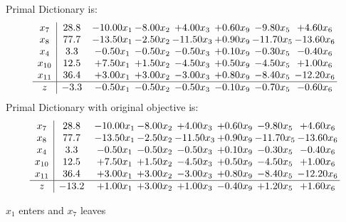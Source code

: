 \documentclass[8pt]{article}
\begin{document}
Primal Dictionary is:
\[\begin{array}{c| c c@{\hskip 2pt} c@{\hskip 2pt} c@{\hskip 2pt} c@{\hskip 2pt} c@{\hskip 2pt} c@{\hskip 2pt} }
 x_{7}   &  28.8 & -10.00 x_{1} & -8.00 x_{2} & +  4.00 x_{3} & +  0.60 x_{9} & -9.80 x_{5} & +  4.60 x_{6}\\
 x_{8}   &  77.7 & -13.50 x_{1} & -2.50 x_{2} & -11.50 x_{3} & +  0.90 x_{9} & -11.70 x_{5} & -13.60 x_{6}\\
 x_{4}   &  3.3 & -0.50 x_{1} & -0.50 x_{2} & -0.50 x_{3} & +  0.10 x_{9} & -0.30 x_{5} & -0.40 x_{6}\\
 x_{10}   &  12.5 & +  7.50 x_{1} & +  1.50 x_{2} & -4.50 x_{3} & +  0.50 x_{9} & -4.50 x_{5} & +  1.00 x_{6}\\
 x_{11}   &  36.4 & +  3.00 x_{1} & +  3.00 x_{2} & -3.00 x_{3} & +  0.80 x_{9} & -8.40 x_{5} & -12.20 x_{6}\\
\hline
z    &  -3.3 & -0.50 x_{1} & -0.50 x_{2} & -0.50 x_{3} & -0.10 x_{9} & -0.70 x_{5} & -0.60 x_{6}\\
\end{array}\]
Primal Dictionary with original objective is:
\[\begin{array}{c| c c@{\hskip 2pt} c@{\hskip 2pt} c@{\hskip 2pt} c@{\hskip 2pt} c@{\hskip 2pt} c@{\hskip 2pt} }
 x_{7}   &  28.8 & -10.00 x_{1} & -8.00 x_{2} & +  4.00 x_{3} & +  0.60 x_{9} & -9.80 x_{5} & +  4.60 x_{6}\\
 x_{8}   &  77.7 & -13.50 x_{1} & -2.50 x_{2} & -11.50 x_{3} & +  0.90 x_{9} & -11.70 x_{5} & -13.60 x_{6}\\
 x_{4}   &  3.3 & -0.50 x_{1} & -0.50 x_{2} & -0.50 x_{3} & +  0.10 x_{9} & -0.30 x_{5} & -0.40 x_{6}\\
 x_{10}   &  12.5 & +  7.50 x_{1} & +  1.50 x_{2} & -4.50 x_{3} & +  0.50 x_{9} & -4.50 x_{5} & +  1.00 x_{6}\\
 x_{11}   &  36.4 & +  3.00 x_{1} & +  3.00 x_{2} & -3.00 x_{3} & +  0.80 x_{9} & -8.40 x_{5} & -12.20 x_{6}\\
\hline
z    &  -13.2 & +  1.00 x_{1} & +  3.00 x_{2} & +  1.00 x_{3} & -0.40 x_{9} & +  1.20 x_{5} & +  1.60 x_{6}\\
\end{array}\]


 $ x_{1} $ enters and $ x_{7} $ leaves 
\end{document}
